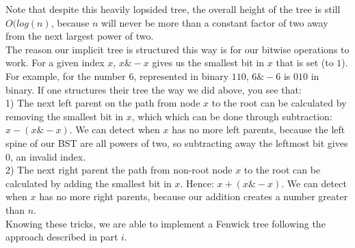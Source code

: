 \documentclass{article}
\theoremstyle{casestyle}
\begin{document}
\begin{enumerate}[i]
  Note that despite this heavily lopsided tree, the overall height of the tree is still $O(log(n)$, because $n$ will never be more than a constant factor of two away from the next largest power of two.\\

  The reason our implicit tree is structured this way is for our bitwise operations to work. For a given index $x$, $x \& -x$ gives us the smallest bit in $x$ that is set (to $1$). For example, for the number $6$, represented in binary $110$, $6 \& -6$ is $010$ in binary. If one structures their tree the way we did above, you see that:\\

  1) The next left parent on the path from node $x$ to the root can be calculated by removing the smallest bit in $x$, which which can be done through subtraction: $x - (x \& -x)$. We can detect when $x$ has no more left parents, because the left spine of our BST are all powers of two, so subtracting away the leftmost bit gives $0$, an invalid index. \\
  2) The next right parent the path from non-root node $x$ to the root can be calculated by adding the smallest bit in $x$. Hence: $x + (x \& -x)$. We can detect when $x$ has no more right parents, because our addition creates a number greater than $n$. \\

  Knowing these tricks, we are able to implement a Fenwick tree following the approach described in part $i$.\\

  \newpage


\end{enumerate}
\end{document}
